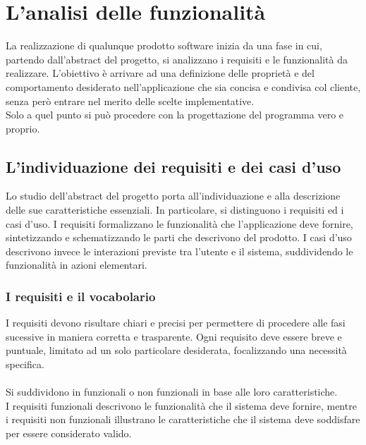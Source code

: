 \chapter{L'analisi delle funzionalità}

La realizzazione di qualunque prodotto software inizia da una fase in cui, 
partendo dall’abstract del progetto, si analizzano i requisiti e le funzionalità da realizzare.
L’obiettivo è arrivare ad una definizione delle proprietà e del comportamento desiderato nell’applicazione che sia concisa e condivisa col cliente,
senza però entrare nel merito delle scelte implementative.\\
Solo a quel punto si può procedere con la progettazione del programma vero e proprio.

\section{L'individuazione dei requisiti e dei casi d’uso}

Lo studio dell’abstract del progetto porta all’individuazione e alla descrizione delle sue caratteristiche essenziali.
In particolare, si distinguono i requisiti ed i casi d'uso.
I requisiti formalizzano le funzionalità che l'applicazione deve fornire, 
sintetizzando e schematizzando le parti che descrivono del prodotto.
I casi d'uso descrivono invece le interazioni previste tra l'utente e il sistema, 
suddividendo le funzionalità in azioni elementari.\\

\subsection{I requisiti e il vocabolario}
I requisiti devono risultare chiari e precisi per permettere di procedere alle fasi sucessive in maniera corretta e trasparente.
Ogni requisito deve essere breve e puntuale, limitato ad un solo particolare desiderata,
focalizzando una necessità specifica.\\
\\
Si suddividono in funzionali o non funzionali in base alle loro caratteristiche.\\
I requisiti funzionali descrivono le funzionalità che il sistema deve fornire,
mentre i requisiti non funzionali illustrano le caratteristiche che il sistema deve soddisfare per essere considerato valido.\\

